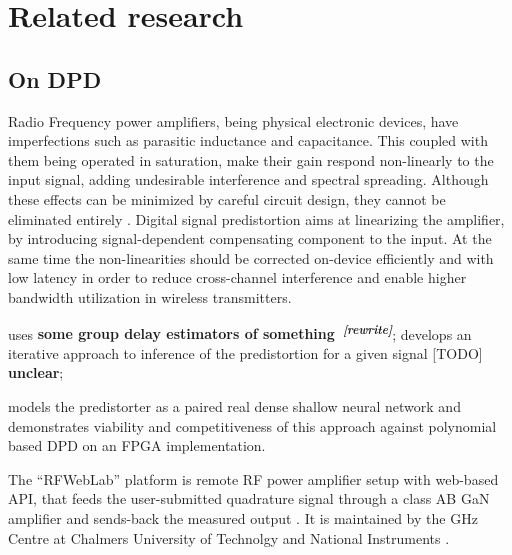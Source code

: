 \documentclass[a4paper,10pt]{article}
\newcommand{\important}[1]{\textbf{\color{red} #1}}
\newcommand{\attn}[2]{\textbf{\color{red} #2~\textsuperscript{\textit{[#1]}}}}
\newcommand{\rewrite}[1]{\attn{rewrite}{#1}}
\newcommand{\todo}[1]{{\color{blue} [TODO]} \important{#1}}
\begin{document}


\section{Related research} %
\label{sec:realted_research}

\subsection{On DPD} %
\label{sub:on_dpd}

Radio Frequency power amplifiers, being physical electronic devices, have imperfections such
as parasitic inductance and capacitance. This coupled with them being operated in saturation,
make their gain respond non-linearly to the input signal, adding undesirable interference and
spectral spreading. Although these effects can be minimized by careful circuit design, they
cannot be eliminated entirely \cite{citation_needed}. Digital signal predistortion aims at
linearizing the amplifier, by introducing signal-dependent compensating component to the input.
At the same time the non-linearities should be corrected on-device efficiently and with low
latency in order to reduce cross-channel interference and enable higher bandwidth utilization
in wireless transmitters.

\cite{traverso2019} uses \rewrite{some group delay estimators of something};
\cite{schoukens2016} develops an iterative approach to inference of the predistortion for a given
signal \todo{unclear};

\cite{traver2019} models the predistorter as a paired real dense shallow neural network and
demonstrates viability and competitiveness of this approach against polynomial based DPD on an
FPGA implementation.

The ``RFWebLab'' platform is remote RF power amplifier setup with web-based API, that feeds
the user-submitted quadrature signal through a class AB GaN amplifier and sends-back the measured
output \cite{dpdcompetiton2018}. It is maintained by the GHz Centre at Chalmers University of
Technolgy and National Instruments \cite{landin_rfweblab_2015}.
\end{document}
